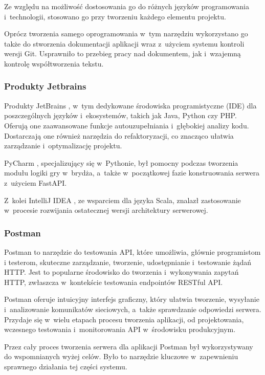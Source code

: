 Ze względu na możliwość dostosowania go do różnych języków programowania
i~technologii, stosowano go przy tworzeniu każdego elementu projektu.

Oprócz tworzenia samego oprogramowania w~tym narzędziu wykorzystano go także
do stworzenia dokumentacji aplikacji wraz z~użyciem systemu kontroli wersji Git.
Usprawniło to przebieg pracy nad dokumentem, jak i~wzajemną kontrolę
współtworzenia tekstu.


\subsubsection{Produkty Jetbrains}

Produkty JetBrains \cite{JetBrains}, w~tym dedykowane środowiska
programistyczne (IDE) dla poszczególnych języków i~ekosystemów,
takich jak Java, Python czy PHP.
Oferują one zaawansowane funkcje autouzupełniania i~głębokiej
analizy kodu. Dostarczają one również narzędzia do refaktoryzacji,
co znacząco ułatwia zarządzanie i~optymalizację projektu.

PyCharm \cite{PyCharm}, specjalizujący się w~Pythonie, był pomocny podczas tworzenia
modułu logiki gry w~brydża, a~także w~początkowej fazie konstruowania
serwera z~użyciem FastAPI.

Z~kolei IntelliJ IDEA \cite{Intellij}, ze wsparciem dla języka
Scala, znalazł zastosowanie w~procesie rozwijania ostatecznej wersji
architektury serwerowej.


\subsubsection{Postman}

Postman \cite{Postman} to narzędzie do testowania API, które umożliwia, głównie
programistom i testerom, skuteczne zarządzanie, tworzenie, udostępnianie
i~testowanie żądań HTTP. Jest to popularne środowisko do tworzenia
i~wykonywania zapytań HTTP, zwłaszcza w~kontekście testowania
endpointów RESTful API.

Postman oferuje intuicyjny interfejs graficzny, który ułatwia tworzenie,
wysyłanie i~analizowanie komunikatów sieciowych, a~także sprawdzanie
odpowiedzi serwera. Przydaje się w~wielu etapach procesu tworzenia
aplikacji, od projektowania, wczesnego testowania i~monitorowania API
w~środowisku produkcyjnym.

Przez cały proces tworzenia serwera dla aplikacji Postman był wykorzystywany
do wspomnianych wyżej celów. Było to narzędzie kluczowe w~zapewnieniu
sprawnego działania tej części systemu.


